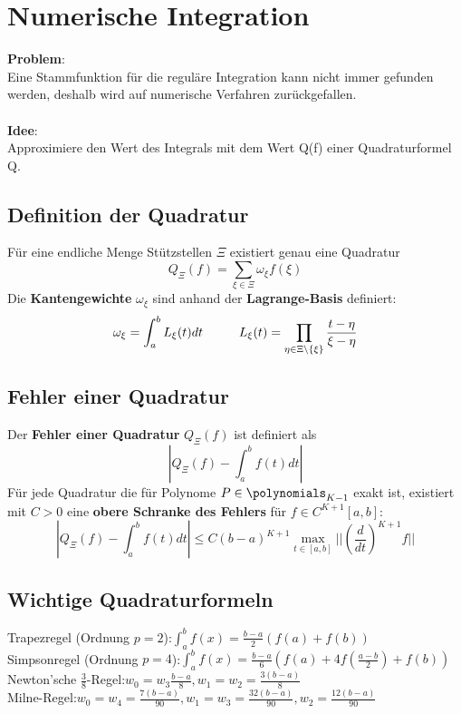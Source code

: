 \section{Numerische Integration}%
\label{ni:sec:numerische-integration}
\textbf{Problem}:\\Eine Stammfunktion für die reguläre Integration kann nicht immer gefunden werden, deshalb wird auf numerische Verfahren zurückgefallen.\\\\
\textbf{Idee}:\\Approximiere den Wert des Integrals mit dem Wert Q(f) einer Quadraturformel Q.

\subsection{Definition der Quadratur}%
\label{ni:sub:definition-quadratur}
Für eine endliche Menge Stützstellen $\Xi$ existiert genau eine Quadratur $$Q_\Xi(f) = \sum_{\xi \in \Xi} \omega_\xi f(\xi)$$
Die \textbf{Kantengewichte} $\omega_\xi$ sind anhand der \textbf{Lagrange-Basis} definiert:
$$\omega_\xi = \int_a^bL_\xi(t)dt\hspace*{1cm}L_\xi(t) = \prod_{\eta \in \Xi \setminus \{\xi\}} \frac{t - \eta}{\xi - \eta}$$

\subsection{Fehler einer Quadratur}%
\label{ni:sub:fehler-quadratur}
Der \textbf{Fehler einer Quadratur} $Q_\Xi(f)$ ist definiert als $$|Q_\Xi(f) - \int^b_af(t)dt|$$
Für jede Quadratur die für Polynome $P \in \polynomials_{K-1}$ exakt ist, existiert mit $C > 0$ eine \textbf{obere Schranke des Fehlers} für $f \in C^{K+1}[a,b]$:
$$|Q_\Xi(f) - \int^b_af(t)dt| \leq C(b - a)^{K+1}\max_{t\in[a,b]}||(\frac{d}{dt})^{K+1}f||$$

\subsection{Wichtige Quadraturformeln}%
\label{ni:sub:quadraturformeln}
Trapezregel (Ordnung $p = 2$):\hfill$\int_{a}^{b} f(x) = \frac{b - a}{2} (f(a) + f(b))$ \\
Simpsonregel (Ordnung $p = 4$):\hfill$\int_{a}^{b} f(x) = \frac{b - a}{6} (f(a) + 4f(\frac{a-b}{2}) + f(b))$ \\
Newton'sche $\frac{3}{8}$-Regel:\hfill$w_0 = w_3 \frac{b - a}{8}, w_1 = w_2 = \frac{3(b - a)}{8}$ \\
Milne-Regel:\hfill$w_0 = w_4 = \frac{7(b - a)}{90}, w_1 = w_3 = \frac{32(b - a)}{90}, w_2 = \frac{12(b - a)}{90}$ \\

